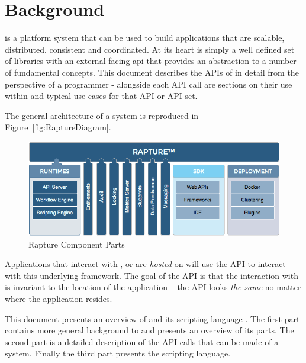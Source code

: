 \chapter{Background}
\Rapture is a platform system that can be used to build applications that are scalable,
distributed, consistent and coordinated. At its heart \Rapture is simply a well defined
set of libraries with an external facing api that provides an abstraction to a number
of fundamental concepts. This document describes the APIs of \Rapture in detail from the
perspective of a programmer - alongside each API call are sections on their use within
\Rapture and typical use cases for that API or API set.

The general architecture of a \Rapture system is reproduced in Figure~\vref{fig:RaptureDiagram}.

\begin{figure}[htb]
\centering
\includegraphics[scale=0.5]{Graphics/rapturecore}
\caption{Rapture Component Parts}
\label{fig:RaptureDiagram}
\end{figure}

Applications that interact with \Rapture, or are \emph{hosted} on \Rapture will
use the \Rapture API to interact with this underlying framework. The goal of
the \Rapture API is that the interaction with \Rapture is invariant to the location
of the application -- the API looks \emph{the same} no matter where the application
resides.

This document presents an overview of \Rapture and its scripting language \Reflex. The first
part contains more general background to \Rapture and presents an overview of its parts. The second
part is a detailed description of the API calls that can be made of a \Rapture system. Finally the third
part presents the \Reflex scripting language.
